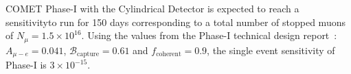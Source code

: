 COMET Phase-I with the Cylindrical Detector is expected to reach a sensitivityto
run for 150 days corresponding to a total number of stopped muons of $N_\mu =
1.5 \times 10^{16}$. Using the values from the Phase-I technical design
report~\cite{the_comet_collaboration_comet_2020}: $A_{\mu-e} = 0.041$,
$\mathcal{B}_\mathrm{capture} = 0.61$ and $f_\mathrm{coherent} = 0.9$, the
single event sensitivity of Phase-I is $3 \times 10^{-15}$.






